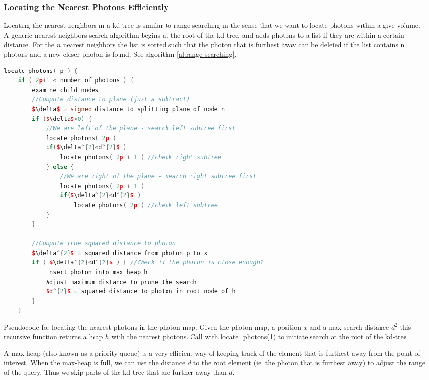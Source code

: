 \subsubsection{Locating the Nearest Photons Efficiently}
Locating the nearest neighbors in a kd-tree is similar to range searching in the sense that we want to locate photons within a give volume. A generic nearest neighbors search algorithm begins at the root of the kd-tree, and adds photons to a list if they are within a certain distance. For the $n$ nearest neighbors the list is sorted such that the photon that is furthest away can be deleted if the list contains n photons and a new closer photon is found. See algorithm \ref{al:range-searching}.

\begin{algorithm}\label{al:range-searching}
\begin{lstlisting}[language=C++, mathescape]
locate_photons( p ) {
	if ( 2p+1 < number of photons ) { 
		examine child nodes
		//Compute distance to plane (just a subtract)
		$\delta$ = signed distance to splitting plane of node n 
		if ($\delta$<0) {
			//We are left of the plane - search left subtree first
			locate photons( 2p ) 
			if($\delta^{2}<d^{2}$ )
				locate photons( 2p + 1 ) //check right subtree 
			} else {
				//We are right of the plane - search right subtree first
				locate photons( 2p + 1 ) 
				if($\delta^{2}<d^{2}$ )
					locate photons( 2p ) //check left subtree 
			}
		}
			
		//Compute true squared distance to photon
		$\delta^{2}$ = squared distance from photon p to x
		if ( $\delta^{2}<d^{2}$ ) { //Check if the photon is close enough?
			insert photon into max heap h
			Adjust maximum distance to prune the search
			$d^{2}$ = squared distance to photon in root node of h 
		}
	}
\end{lstlisting}
\caption{Pseudocode for locating the nearest photons in the photon map. Given the photon map, a position $x$ and a max search distance $d^{2}$
this recursive function returns a heap $h$ with the nearest photons. Call with locate\_photons(1) to initiate search at the root of the kd-tree}
\end{algorithm}

A max-heap (also known as a priority queue) is a very efficient way of keeping track of the element that is furthest away from the point of interest. When the max-heap is full, we can use the distance $d$ to the root element (ie. the photon that is furthest away) to adjust the range of the query. Thus we skip parts of the kd-tree that are further away than $d$.

